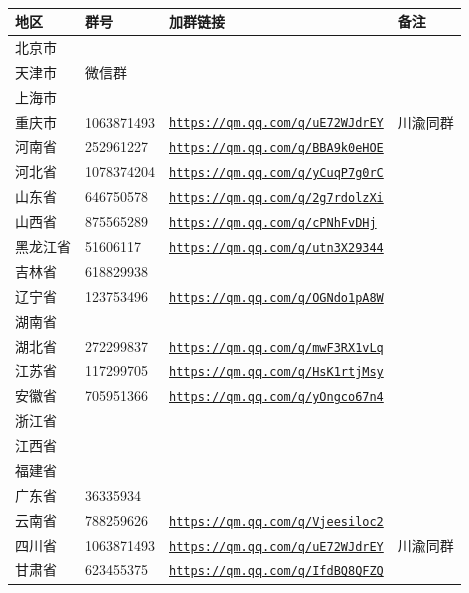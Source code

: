 \documentclass[UTF8,fontset=none,zihao=-4]{ctexart}
\newcommand{\grouplink}[1]{\href{#1}{\nolinkurl{#1}}}
\begin{document}
\begin{center}

%
\\[2.5mm]

{
\begin{tabular}{|C{38mm}|C{36mm}|C{85mm}|C{22mm}|}
\hline
\textbf{地区} & \textbf{群号} & \textbf{加群链接} & \textbf{备注} \\
\hline
北京市 & & & \\
\hline
天津市 & 微信群 & & \\
\hline
上海市 & & & \\
\hline
重庆市 & 1063871493 & \grouplink{https://qm.qq.com/q/uE72WJdrEY} & 川渝同群 \\
\hline
河南省 & 252961227 & \grouplink{https://qm.qq.com/q/BBA9k0eHOE} & \\
\hline
河北省 & 1078374204 & \grouplink{https://qm.qq.com/q/yCuqP7g0rC} & \\
\hline
山东省 & 646750578 & \grouplink{https://qm.qq.com/q/2g7rdolzXi} & \\
\hline
山西省 & 875565289 & \grouplink{https://qm.qq.com/q/cPNhFvDHj} & \\
\hline
黑龙江省 & 51606117 & \grouplink{https://qm.qq.com/q/utn3X29344} & \\
\hline
吉林省 & 618829938 & &  \\
\hline
辽宁省 & 123753496 & \grouplink{https://qm.qq.com/q/OGNdo1pA8W} & \\
\hline
湖南省 & & & \\
\hline
湖北省 & 272299837 & \grouplink{https://qm.qq.com/q/mwF3RX1vLq} & \\
\hline
江苏省 & 117299705 & \grouplink{https://qm.qq.com/q/HsK1rtjMsy} & \\
\hline
安徽省 & 705951366 & \grouplink{https://qm.qq.com/q/yOngco67n4} & \\
\hline
浙江省 & &  & \\
\hline
江西省 & &  & \\
\hline
福建省 & &  & \\
\hline
广东省 & 36335934 & &  \\
\hline
云南省 & 788259626 & \grouplink{https://qm.qq.com/q/Vjeesiloc2} & \\
\hline
四川省 & 1063871493 & \grouplink{https://qm.qq.com/q/uE72WJdrEY} & 川渝同群 \\
\hline
甘肃省 & 623455375 & \grouplink{https://qm.qq.com/q/IfdBQ8QFZQ} & \\

\end{tabular}}
\end{center}
\end{document}
